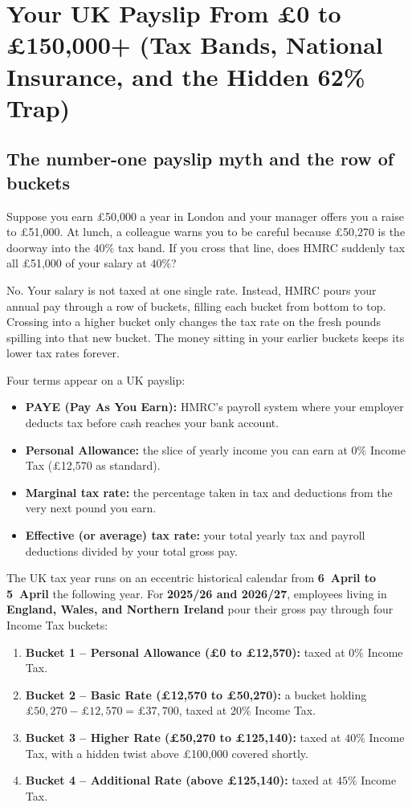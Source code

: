 \section{Your UK Payslip From \pounds 0 to \pounds 150,000+ (Tax Bands, National Insurance, and the Hidden 62\% Trap)}

\subsection{The number-one payslip myth and the row of buckets}

Suppose you earn \pounds 50,000 a year in London and your manager offers you a raise to \pounds 51,000. At lunch, a colleague warns you to be careful because \pounds 50,270 is the doorway into the $40\%$ tax band. If you cross that line, does HMRC suddenly tax all \pounds 51,000 of your salary at $40\%$?

No. Your salary is not taxed at one single rate. Instead, HMRC pours your annual pay through a row of buckets, filling each bucket from bottom to top. Crossing into a higher bucket only changes the tax rate on the fresh pounds spilling into that new bucket. The money sitting in your earlier buckets keeps its lower tax rates forever.

Four terms appear on a UK payslip:
\begin{itemize}
  \item \textbf{PAYE (Pay As You Earn):} HMRC's payroll system where your employer deducts tax before cash reaches your bank account.
  \item \textbf{Personal Allowance:} the slice of yearly income you can earn at $0\%$ Income Tax (\pounds 12,570 as standard).
  \item \textbf{Marginal tax rate:} the percentage taken in tax and deductions from the very next pound you earn.
  \item \textbf{Effective (or average) tax rate:} your total yearly tax and payroll deductions divided by your total gross pay.
\end{itemize}

The UK tax year runs on an eccentric historical calendar from \textbf{6~April to 5~April} the following year. For \textbf{2025/26 and 2026/27}, employees living in \textbf{England, Wales, and Northern Ireland} pour their gross pay through four Income Tax buckets:
\begin{enumerate}
  \item \textbf{Bucket 1 -- Personal Allowance (\pounds 0 to \pounds 12,570):} taxed at $0\%$ Income Tax.
  \item \textbf{Bucket 2 -- Basic Rate (\pounds 12,570 to \pounds 50,270):} a bucket holding $\pounds 50{,}270 - \pounds 12{,}570 = \pounds 37{,}700$, taxed at $20\%$ Income Tax.
  \item \textbf{Bucket 3 -- Higher Rate (\pounds 50,270 to \pounds 125,140):} taxed at $40\%$ Income Tax, with a hidden twist above \pounds 100,000 covered shortly.
  \item \textbf{Bucket 4 -- Additional Rate (above \pounds 125,140):} taxed at $45\%$ Income Tax.
\end{enumerate}

